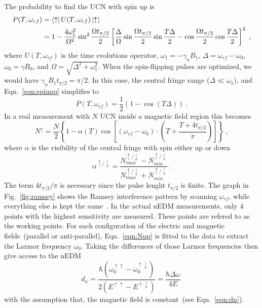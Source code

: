 The probability to find the UCN with spin up is
\begin{align}
  \label{eqn:spinup}
  P(T, \omega_{rf}) &= \bra{\uparrow} U(T, \omega_{rf}) \ket{\uparrow} \\ \nonumber
  &= 1 - \frac{4 \omega_1^2}{\Omega^2} \sin ^2 \frac{\Omega t_{\pi/2}}{2} \left[ \frac{\Delta}{\Omega} \sin  \frac{\Omega t_{\pi/2}}{2} \sin \frac{T\Delta}{2} - \cos  \frac{\Omega t_{\pi/2}}{2} \cos\frac{T\Delta}{2} \right]^2~,
\end{align}
where $U(T, \omega_{rf})$ is the time evolutions operator,
$\omega_1 = - \gamma_n B_1$, $\Delta = \omega_{rf} - \omega_0$,
$\omega_0 = \gamma B_0$, and $\Omega = \sqrt{\Delta^2 +
  \omega_1^2}$. When the spin-flipping pulses are optimized, we would
have $\gamma_n B_1 t_{\pi/2} = \pi / 2$. In this case, the central
fringe range ($\Delta \ll \omega_1$), and Eqn.~\ref{eqn:spinup}
simplifies to
\begin{equation}
  P(T, \omega_{rf}) = \frac{1}{2} \left( 1 - \cos(T\Delta) \right)~.
\end{equation}
In a real measurement with $N$ UCN inside a magnetic field region this
becomes
\begin{equation}
  \label{eqn:Nup}
  N^{\uparrow} = \frac{N}{2} \left\lbrace 1 - \alpha(T) \cos \left[ (\omega_{rf} - \omega_0 ) \cdot \left(T+\frac{T+4t_{\pi/2}}{\pi}\right)\right]\right\rbrace~,
\end{equation}
where $\alpha$ is the visibility of the central fringe with spin
either up or down
\begin{equation}
  \label{eqn:visibility}
  \alpha^{\uparrow /\downarrow} = \frac{N_{max}^{\uparrow /\downarrow} - N_{min}^{\uparrow /\downarrow}}{N_{max}^{\uparrow /\downarrow}+ N_{min}^{\uparrow /\downarrow}}~.
\end{equation}
The term $4t_{\pi/2}/\pi$ is necessary since the pulse lenght
$t_{\pi/2}$ is finite. The graph in Fig.~\ref{fig:ramsey} shows the
Ramsey interference pattern by scanning $\omega_{rf}$, while
everything else is kept the same~\cite{Schmidt-Wellenburg:2016nfv}. In
the actual nEDM measurements, only 4 points with the highest
sensitivity are measured. These points are refered to as the working
points. For each configuration of the electric and magnetic
fields~(parallel or anti-parallel), Eqn.~\ref{eqn:Nup} is fitted to
the data to extract the Larmor frequency $\omega_0$. Taking the
differences of those Larmor frequencies then give access to the nEDM
\begin{equation}
  \label{eqn:fitteddn}
  d_n = \frac{\hbar (\omega_0 ^{\uparrow \uparrow} - \omega_0 ^{\uparrow \downarrow})}{2(E^{\uparrow \uparrow} - E^{\uparrow \downarrow})} = \frac{\hbar \Delta \omega}{4E}~
\end{equation}
with the assumption that, the magnetic field is constant~(see
Eqn.~\ref{eqn:dn}).


